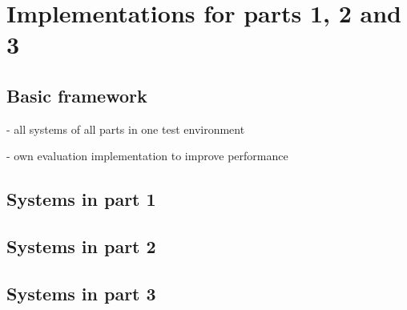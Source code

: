 
\section{Implementations for parts 1, 2 and 3}

\subsection{Basic framework}

- all systems of all parts in one test environment

- own evaluation implementation to improve performance

\subsection{Systems in part 1}
\subsection{Systems in part 2}
\subsection{Systems in part 3}


